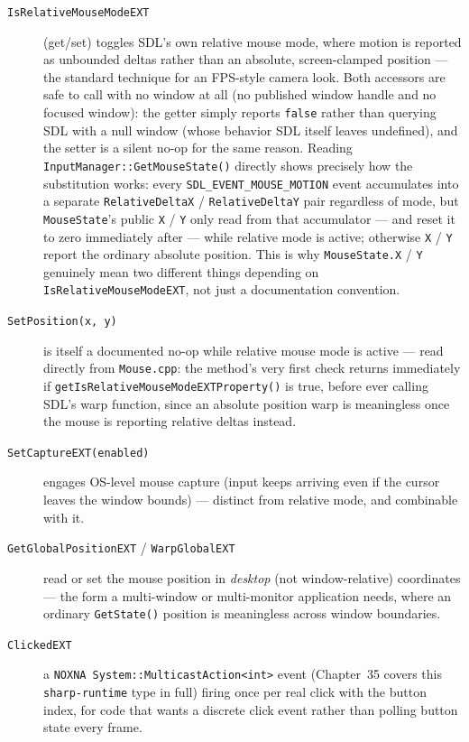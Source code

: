 \begin{description}
\item[\texttt{IsRelativeMouseModeEXT}] (get/set)
  toggles SDL's own relative mouse mode, where motion is reported as unbounded deltas rather
  than an absolute, screen-clamped position --- the standard technique for an FPS-style camera
  look. Both accessors are safe to call with no window at all (no published window handle and
  no focused window): the getter simply reports \texttt{false} rather than querying SDL with a
  null window (whose behavior SDL itself leaves undefined), and the setter is a silent no-op
  for the same reason. Reading \texttt{InputManager::GetMouseState()} directly shows precisely
  how the substitution works: every \texttt{SDL\_EVENT\_MOUSE\_MOTION} event accumulates into
  a separate \texttt{RelativeDeltaX} / \texttt{RelativeDeltaY} pair regardless of mode, but
  \texttt{MouseState}'s public \texttt{X} / \texttt{Y} only read from that accumulator --- and
  reset it to zero immediately after --- while relative mode is active; otherwise \texttt{X} /
  \texttt{Y} report the ordinary absolute position. This is why \texttt{MouseState.X} / \texttt{Y}
  genuinely mean two different things depending on \texttt{IsRelativeMouseModeEXT}, not just a
  documentation convention.
\item[\texttt{SetPosition(x, y)}] is itself a documented no-op while relative mouse mode is
  active --- read directly from \texttt{Mouse.cpp}: the method's very first check returns
  immediately if \texttt{getIsRelativeMouseModeEXTProperty()} is true, before ever calling
  SDL's warp function, since an absolute position warp is meaningless once the mouse is
  reporting relative deltas instead.
\item[\texttt{SetCaptureEXT(enabled)}] engages OS-level mouse capture (input keeps arriving
  even if the cursor leaves the window bounds) --- distinct from relative mode, and combinable
  with it.
\item[\texttt{GetGlobalPositionEXT} / \texttt{WarpGlobalEXT}] read or set the mouse position in
  \emph{desktop} (not window-relative) coordinates --- the form a multi-window or
  multi-monitor application needs, where an ordinary \texttt{GetState()} position is
  meaningless across window boundaries.
\item[\texttt{ClickedEXT}] a \texttt{NOXNA System::MulticastAction<int>} event (Chapter~35
  covers this \texttt{sharp-runtime} type in full) firing once per real click with the button
  index, for code that wants a discrete click event rather than polling button state every
  frame.
\end{description}

